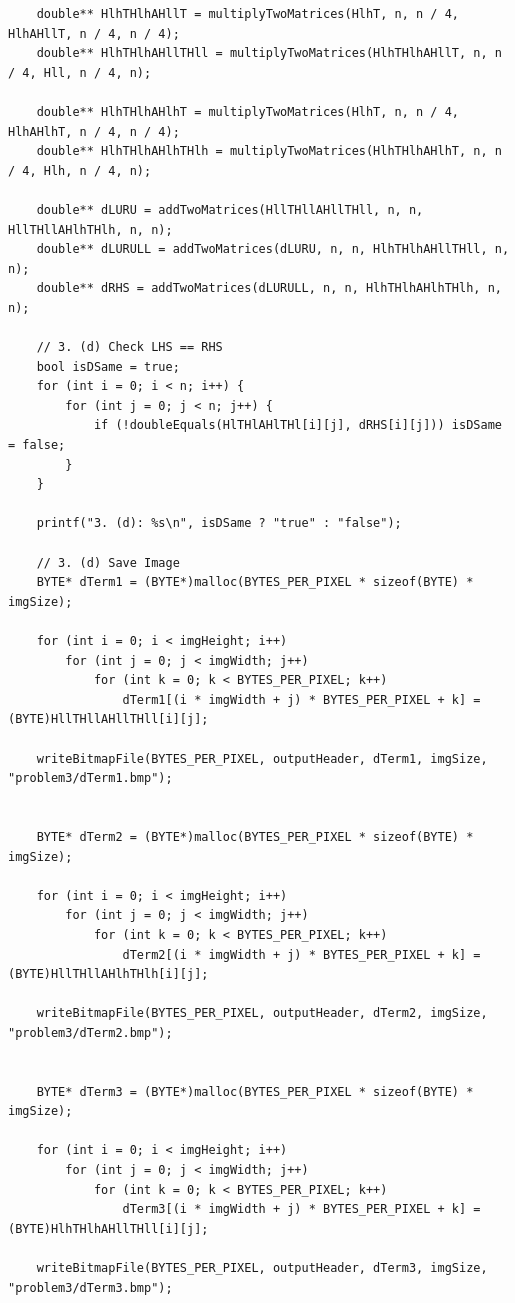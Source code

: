 \begin{verbatim}
    double** HlhTHlhAHllT = multiplyTwoMatrices(HlhT, n, n / 4, HlhAHllT, n / 4, n / 4);
    double** HlhTHlhAHllTHll = multiplyTwoMatrices(HlhTHlhAHllT, n, n / 4, Hll, n / 4, n);

    double** HlhTHlhAHlhT = multiplyTwoMatrices(HlhT, n, n / 4, HlhAHlhT, n / 4, n / 4);
    double** HlhTHlhAHlhTHlh = multiplyTwoMatrices(HlhTHlhAHlhT, n, n / 4, Hlh, n / 4, n);

    double** dLURU = addTwoMatrices(HllTHllAHllTHll, n, n, HllTHllAHlhTHlh, n, n);
    double** dLURULL = addTwoMatrices(dLURU, n, n, HlhTHlhAHllTHll, n, n);
    double** dRHS = addTwoMatrices(dLURULL, n, n, HlhTHlhAHlhTHlh, n, n);

    // 3. (d) Check LHS == RHS
    bool isDSame = true;
    for (int i = 0; i < n; i++) {
        for (int j = 0; j < n; j++) {
            if (!doubleEquals(HlTHlAHlTHl[i][j], dRHS[i][j])) isDSame = false;
        }
    }

    printf("3. (d): %s\n", isDSame ? "true" : "false");

    // 3. (d) Save Image
    BYTE* dTerm1 = (BYTE*)malloc(BYTES_PER_PIXEL * sizeof(BYTE) * imgSize);

    for (int i = 0; i < imgHeight; i++)
        for (int j = 0; j < imgWidth; j++)
            for (int k = 0; k < BYTES_PER_PIXEL; k++)
                dTerm1[(i * imgWidth + j) * BYTES_PER_PIXEL + k] = (BYTE)HllTHllAHllTHll[i][j];

    writeBitmapFile(BYTES_PER_PIXEL, outputHeader, dTerm1, imgSize, "problem3/dTerm1.bmp");


    BYTE* dTerm2 = (BYTE*)malloc(BYTES_PER_PIXEL * sizeof(BYTE) * imgSize);

    for (int i = 0; i < imgHeight; i++)
        for (int j = 0; j < imgWidth; j++)
            for (int k = 0; k < BYTES_PER_PIXEL; k++)
                dTerm2[(i * imgWidth + j) * BYTES_PER_PIXEL + k] = (BYTE)HllTHllAHlhTHlh[i][j];

    writeBitmapFile(BYTES_PER_PIXEL, outputHeader, dTerm2, imgSize, "problem3/dTerm2.bmp");


    BYTE* dTerm3 = (BYTE*)malloc(BYTES_PER_PIXEL * sizeof(BYTE) * imgSize);

    for (int i = 0; i < imgHeight; i++)
        for (int j = 0; j < imgWidth; j++)
            for (int k = 0; k < BYTES_PER_PIXEL; k++)
                dTerm3[(i * imgWidth + j) * BYTES_PER_PIXEL + k] = (BYTE)HlhTHlhAHllTHll[i][j];

    writeBitmapFile(BYTES_PER_PIXEL, outputHeader, dTerm3, imgSize, "problem3/dTerm3.bmp");



\end{verbatim}
